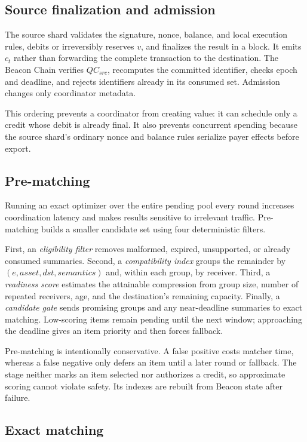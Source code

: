 \documentclass[sigconf,anonymous,review]{acmart}
\begin{document}
\subsection{Source finalization and admission}

The source shard validates the signature, nonce, balance, and local execution rules, debits or irreversibly reserves $v$, and finalizes the result in a block. It emits $c_t$ rather than forwarding the complete transaction to the destination. The Beacon Chain verifies $QC_{src}$, recomputes the committed identifier, checks epoch and deadline, and rejects identifiers already in its consumed set. Admission changes only coordinator metadata.

This ordering prevents a coordinator from creating value: it can schedule only a credit whose debit is already final. It also prevents concurrent spending because the source shard's ordinary nonce and balance rules serialize payer effects before export.

\subsection{Pre-matching}

Running an exact optimizer over the entire pending pool every round increases coordination latency and makes results sensitive to irrelevant traffic. Pre-matching builds a smaller candidate set using four deterministic filters.

First, an \emph{eligibility filter} removes malformed, expired, unsupported, or already consumed summaries. Second, a \emph{compatibility index} groups the remainder by $(e,asset,dst,semantics)$ and, within each group, by receiver. Third, a \emph{readiness score} estimates the attainable compression from group size, number of repeated receivers, age, and the destination's remaining capacity. Finally, a \emph{candidate gate} sends promising groups and any near-deadline summaries to exact matching. Low-scoring items remain pending until the next window; approaching the deadline gives an item priority and then forces fallback.

Pre-matching is intentionally conservative. A false positive costs matcher time, whereas a false negative only defers an item until a later round or fallback. The stage neither marks an item selected nor authorizes a credit, so approximate scoring cannot violate safety. Its indexes are rebuilt from Beacon state after failure.

\subsection{Exact matching}
\end{document}
